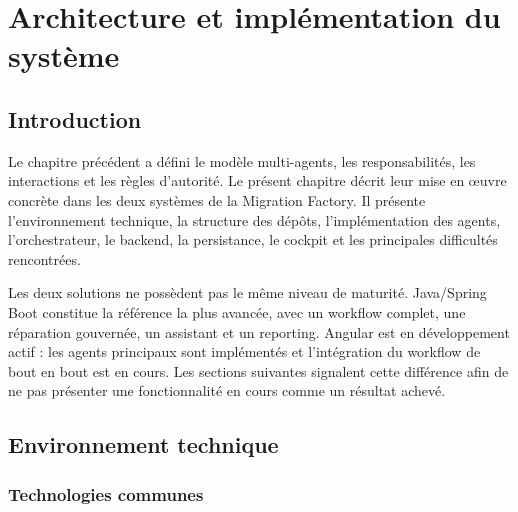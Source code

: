 \chapter{Architecture et implémentation du système}

\section*{Introduction}

Le chapitre précédent a défini le modèle multi-agents, les responsabilités, les interactions et les règles d'autorité. Le présent chapitre décrit leur mise en œuvre concrète dans les deux systèmes de la Migration Factory. Il présente l'environnement technique, la structure des dépôts, l'implémentation des agents, l'orchestrateur, le backend, la persistance, le cockpit et les principales difficultés rencontrées.

Les deux solutions ne possèdent pas le même niveau de maturité. Java/Spring Boot constitue la référence la plus avancée, avec un workflow complet, une réparation gouvernée, un assistant et un reporting. Angular est en développement actif : les agents principaux sont implémentés et l'intégration du workflow de bout en bout est en cours. Les sections suivantes signalent cette différence afin de ne pas présenter une fonctionnalité en cours comme un résultat achevé.

\section{Environnement technique}

\subsection{Technologies communes}


